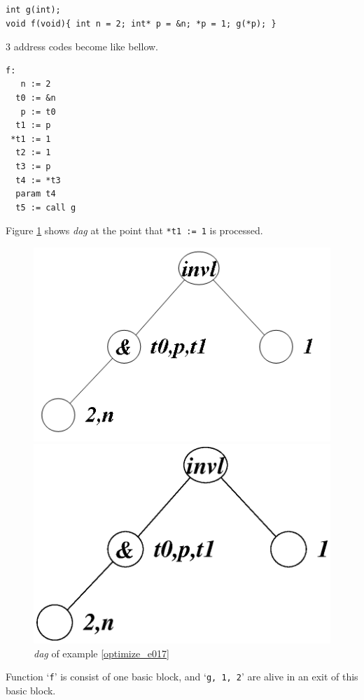 \begin{Example}
\begin{verbatim}
int g(int);
void f(void){ int n = 2; int* p = &n; *p = 1; g(*p); }
\end{verbatim}
3 address codes become like bellow.
\begin{verbatim}
f:
   n := 2
  t0 := &n
   p := t0
  t1 := p
 *t1 := 1
  t2 := 1
  t3 := p
  t4 := *t3
  param t4
  t5 := call g
\end{verbatim}
Figure \ref{optimize_e018} shows {\em dag} at the point that
{\tt{*t1 := 1}} is processed.
\begin{figure}[htbp]
\begin{center}
\begin{htmlonly}
\includegraphics[width=0.8\linewidth,height=0.525\linewidth]{opt007.png}
\end{htmlonly}
\begin{latexonly}
\includegraphics[width=0.8\linewidth,height=0.525\linewidth]{opt007.eps}
\end{latexonly}
\caption{{\em dag} of example \ref{optimize_e017}}
\label{optimize_e018}
\end{center}
\end{figure}
Function `{\tt{f}}' is consist of one basic block, and 
`{\tt{g, 1, 2}}' are alive in an exit of this basic block.

\end{Example}
